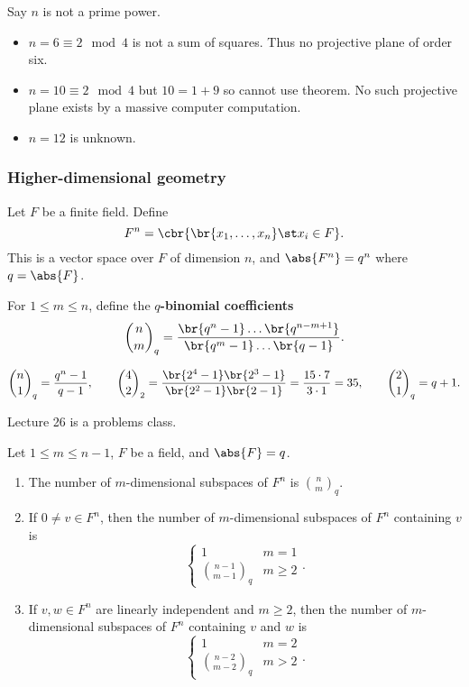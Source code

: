 \begin{example*}
Say $ n $ is not a prime power.
\begin{itemize}
\item $ n = 6 \equiv 2 \mod 4 $ is not a sum of squares. Thus no projective plane of order six.
\item $ n = 10 \equiv 2 \mod 4 $ but $ 10 = 1 + 9 $ so cannot use theorem. No such projective plane exists by a massive computer computation.
\item $ n = 12 $ is unknown.
\end{itemize}
\end{example*}

\pagebreak

\subsubsection{Higher-dimensional geometry}

Let $ F $ be a finite field. Define
$$ F^n = \cbr{\br{x_1, \dots, x_n} \st x_i \in F}. $$
This is a vector space over $ F $ of dimension $ n $, and $ \abs{F^n} = q^n $ where $ q = \abs{F} $.

\begin{definition*}
For $ 1 \le m \le n $, define the \textbf{$ q $-binomial coefficients}
$$ \binom{n}{m}_q = \dfrac{\br{q^n - 1} \dots \br{q^{n - m + 1}}}{\br{q^m - 1} \dots \br{q - 1}}. $$
\end{definition*}

\begin{example*}
$$ \binom{n}{1}_q = \dfrac{q^n - 1}{q - 1}, \qquad \binom{4}{2}_2 = \dfrac{\br{2^4 - 1}\br{2^3 - 1}}{\br{2^2 - 1}\br{2 - 1}} = \dfrac{15 \cdot 7}{3 \cdot 1} = 35, \qquad \binom{2}{1}_q = q + 1. $$
\end{example*}


Lecture 26 is a problems class.


\begin{proposition}
\label{prop:3.16}
Let $ 1 \le m \le n - 1 $, $ F $ be a field, and $ \abs{F} = q $.
\begin{enumerate}
\item The number of $ m $-dimensional subspaces of $ F^n $ is $ \binom{n}{m}_q $.
\item If $ 0 \ne v \in F^n $, then the number of $ m $-dimensional subspaces of $ F^n $ containing $ v $ is
$$
\begin{cases}
1 & m = 1 \\
\binom{n - 1}{m - 1}_q & m \ge 2
\end{cases}.
$$
\item If $ v, w \in F^n $ are linearly independent and $ m \ge 2 $, then the number of $ m $-dimensional subspaces of $ F^n $ containing $ v $ and $ w $ is
$$
\begin{cases}
1 & m = 2 \\
\binom{n - 2}{m - 2}_q & m > 2
\end{cases}.
$$
\end{enumerate}
\end{proposition}

